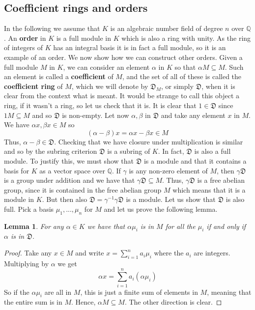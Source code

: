 \documentclass{article}
\newtheorem{lemma}{Lemma}[section]
\newcommand{\mfrak}[1]{\mathfrak{#1}}
\newcommand{\mbb}[1]{\mathbb{#1}}
\numberwithin{equation}{section}
\begin{document}
\subsection{Coefficient rings and orders}
In the following we assume that $K$ is an algebraic number field of degree $n$ over $\mbb Q$. An \textbf{order} in $K$ is a full module in $K$ which is also a ring with unity. As the ring of integers of $K$ has an integral basis it is in fact a full module, so it is an example of an order. We now show how we can construct other orders. Given a full module $M$ in $K$, we can consider an element $\alpha$ in $K$ so that $\alpha M \subseteq M$. Such an element is called a \textbf{coefficient} of $M$, and the set of all of these is called the \textbf{coefficient ring} of $M$, which we will denote by $\mfrak D_M$, or simply $\mfrak D$, when it is clear from the context what is meant. It would be strange to call this object a ring, if it wasn't a ring, so let us check that it is. It is clear that $1 \in \mfrak{D}$ since $1 M \subseteq M$ and so $\mfrak{D}$ is non-empty. Let now $\alpha, \beta$ in $\mfrak D$ and take any element $x$ in $M$. We have $\alpha x, \beta x \in M$ so $$(\alpha - \beta)x = \alpha x - \beta x \in M$$
Thus, $\alpha - \beta \in \mfrak{D}$. Checking that we have closure under multiplication is similar and so by the subring criterion $\mfrak{D}$ is a subring of $K$. In fact, $\mfrak{D}$ is also a full module. To justify this, we must show that $\mfrak{D}$ is a module and that it contains a basis for $K$ as a vector space over $\mbb Q$. If $\gamma$ is any non-zero element of $M$, then $\gamma \mfrak{D}$ is a group under addition and we have that $\gamma \mfrak{D} \subseteq M$. Thus, $\gamma \mfrak D$ is a free abelian group, since it is contained in the free abelian group $M$ which means that it is a module in $K$. But then also $\mfrak{D} = \gamma^{-1} \gamma \mfrak{D}$ is a module. Let us show that $\mfrak D$ is also full. Pick a basis $\mu_1, ..., \mu_n$ for $M$ and let us prove the following lemma.
\begin{lemma}\label{lem:SufficientConditionForCoefficient}
    For any $\alpha \in K$ we have that $\alpha \mu_i$ is in $M$ for all the $\mu_i$ if and only if $\alpha$ is in $\mfrak D$.
\end{lemma}
\begin{proof}
    Take any $x \in M$ and write $x = \sum_{i=1}^n a_i \mu_i$ where the $a_i$ are integers. Multiplying by $\alpha$ we get
    $$\alpha x = \sum_{i=1}^n a_i (\alpha \mu_i)$$
    So if the $\alpha \mu_i$ are all in $M$, this is just a finite sum of elements in $M$, meaning that the entire sum is in $M$. Hence, $\alpha M \subseteq M$. The other direction is clear.
\end{proof}
\end{document}
